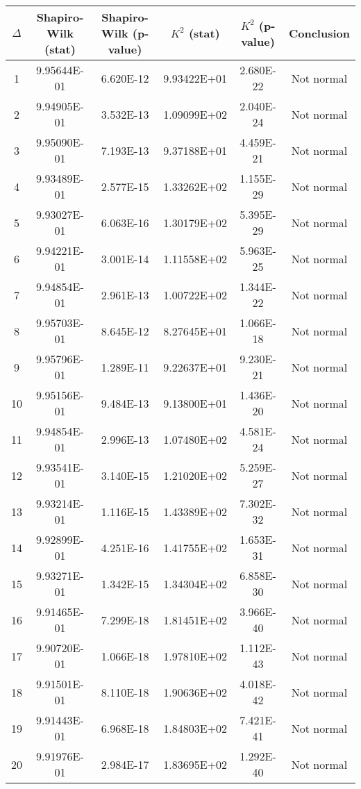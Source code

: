 \begin{table}[h]
	\begin{tabular}{|c|c|c|c|c|c|}
		\hline
		$\Delta$ &  Shapiro-Wilk (stat) & Shapiro-Wilk (p-value) & $K^2$ (stat) & $K^2$ (p-value) & Conclusion\\\hline
		\hline
		1 & 9.95644E-01 & 6.620E-12 & 9.93422E+01 & 2.680E-22 & Not normal\\\hline
		2 & 9.94905E-01 & 3.532E-13 & 1.09099E+02 & 2.040E-24 & Not normal\\\hline
		3 & 9.95090E-01 & 7.193E-13 & 9.37188E+01 & 4.459E-21 & Not normal\\\hline
		4 & 9.93489E-01 & 2.577E-15 & 1.33262E+02 & 1.155E-29 & Not normal\\\hline
		5 & 9.93027E-01 & 6.063E-16 & 1.30179E+02 & 5.395E-29 & Not normal\\\hline
		6 & 9.94221E-01 & 3.001E-14 & 1.11558E+02 & 5.963E-25 & Not normal\\\hline
		7 & 9.94854E-01 & 2.961E-13 & 1.00722E+02 & 1.344E-22 & Not normal\\\hline
		8 & 9.95703E-01 & 8.645E-12 & 8.27645E+01 & 1.066E-18 & Not normal\\\hline
		9 & 9.95796E-01 & 1.289E-11 & 9.22637E+01 & 9.230E-21 & Not normal\\\hline
		10 & 9.95156E-01 & 9.484E-13 & 9.13800E+01 & 1.436E-20 & Not normal\\\hline
		11 & 9.94854E-01 & 2.996E-13 & 1.07480E+02 & 4.581E-24 & Not normal\\\hline
		12 & 9.93541E-01 & 3.140E-15 & 1.21020E+02 & 5.259E-27 & Not normal\\\hline
		13 & 9.93214E-01 & 1.116E-15 & 1.43389E+02 & 7.302E-32 & Not normal\\\hline
		14 & 9.92899E-01 & 4.251E-16 & 1.41755E+02 & 1.653E-31 & Not normal\\\hline
		15 & 9.93271E-01 & 1.342E-15 & 1.34304E+02 & 6.858E-30 & Not normal\\\hline
		16 & 9.91465E-01 & 7.299E-18 & 1.81451E+02 & 3.966E-40 & Not normal\\\hline
		17 & 9.90720E-01 & 1.066E-18 & 1.97810E+02 & 1.112E-43 & Not normal\\\hline
		18 & 9.91501E-01 & 8.110E-18 & 1.90636E+02 & 4.018E-42 & Not normal\\\hline
		19 & 9.91443E-01 & 6.968E-18 & 1.84803E+02 & 7.421E-41 & Not normal\\\hline
		20 & 9.91976E-01 & 2.984E-17 & 1.83695E+02 & 1.292E-40 & Not normal\\\hline

\end{tabular}
\end{table}
